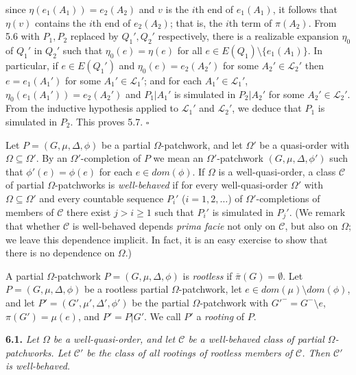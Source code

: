 \noindent since $\eta(e_1(A_1)) = e_2(A_2)$ and $v$ is the $i$th end of $e_1(A_1)$, it follows that $\eta(v)$ contains the $i$th end of $e_2(A_2)$; that is, the $i$th term of $\pi(A_2)$. From 5.6 with $P_1, P_2$ replaced by $Q_1', Q_2'$ respectively, there is a realizable expansion $\eta_0$ of $Q_1'$ in $Q_2'$ such that $\eta_0(e) = \eta(e)$ for all $e \in E(Q_1) \setminus \{e_1(A_1)\}$. In particular, if $e \in E(Q_1')$ and $\eta_0(e) = e_2(A_2')$ for some $A_2' \in \mathscr{L}_2'$ then $e = e_1(A_1')$ for some $A_1' \in \mathscr{L}_1'$; and for each $A_1' \in \mathscr{L}_1'$, $\eta_0(e_1(A_1')) = e_2(A_2')$ and $P_1|A_1'$ is simulated in $P_2|A_2'$ for some $A_2' \in \mathscr{L}_2'$. From the inductive hypothesis applied to $\mathscr{L}_1'$ and $\mathscr{L}_2'$, we deduce that $P_1$ is simulated in $P_2$. This proves 5.7. $\square$


Let $P = (G, \mu, \Delta, \phi)$ be a partial $\Omega$-patchwork, and let $\Omega'$ be a quasi-order with $\Omega \subseteq \Omega'$. By an $\Omega'$-completion of $P$ we mean an $\Omega'$-patchwork $(G, \mu, \Delta, \phi')$ such that $\phi'(e) = \phi(e)$ for each $e \in dom(\phi)$. If $\Omega$ is a well-quasi-order, a class $\mathscr{C}$ of partial $\Omega$-patchworks is \textit{well-behaved} if for every well-quasi-order $\Omega'$ with $\Omega \subseteq \Omega'$ and every countable sequence $P_i'$ ($i = 1, 2, \dots$) of $\Omega'$-completions of members of $\mathscr{C}$ there exist $j > i \ge 1$ such that $P_i'$ is simulated in $P_j'$. (We remark that whether $\mathscr{C}$ is well-behaved depends \textit{prima facie} not only on $\mathscr{C}$, but also on $\Omega$; we leave this dependence implicit. In fact, it is an easy exercise to show that there is no dependence on $\Omega$.)

A partial $\Omega$-patchwork $P = (G, \mu, \Delta, \phi)$ is \textit{rootless} if $\bar{\pi}(G) = \emptyset$. Let $P = (G, \mu, \Delta, \phi)$ be a rootless partial $\Omega$-patchwork, let $e \in dom(\mu) \setminus dom(\phi)$, and let $P' = (G', \mu', \Delta', \phi')$ be the partial $\Omega$-patchwork with $G'^- = G^- \setminus e$, $\pi(G') = \mu(e)$, and $P' = P|G'$. We call $P'$ a \textit{rooting} of $P$.

\textbf{6.1.} \textit{Let $\Omega$ be a well-quasi-order, and let $\mathscr{C}$ be a well-behaved class of partial $\Omega$-patchworks. Let $\mathscr{C}'$ be the class of all rootings of rootless members of $\mathscr{C}$. Then $\mathscr{C}'$ is well-behaved.}

